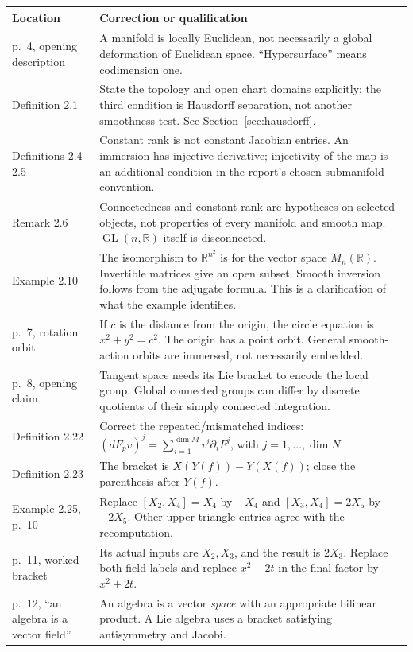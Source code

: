 \documentclass[11pt,a4paper]{article}
\numberwithin{equation}{section}
\theoremstyle{definition}
\theoremstyle{plain}
\theoremstyle{remark}
\newcommand{\R}{\mathbb R}
\newcommand{\GL}{\operatorname{GL}}
\begin{document}
\small
\begin{longtable}{@{}>{\raggedright\arraybackslash}p{.21\linewidth}>{\raggedright\arraybackslash}p{.73\linewidth}@{}}
\toprule Location & Correction or qualification \\
\midrule\endhead
p.~4, opening description & A manifold is locally Euclidean, not necessarily a global deformation of Euclidean space. ``Hypersurface'' means codimension one.\\
Definition 2.1 & State the topology and open chart domains explicitly; the third condition is Hausdorff separation, not another smoothness test. See Section~\ref{sec:hausdorff}.\\
Definitions 2.4--2.5 & Constant rank is not constant Jacobian entries. An immersion has injective derivative; injectivity of the map is an additional condition in the report's chosen submanifold convention.\\
Remark 2.6 & Connectedness and constant rank are hypotheses on selected objects, not properties of every manifold and smooth map. $\GL(n,\R)$ itself is disconnected.\\
Example 2.10 & The isomorphism to $\R^{n^2}$ is for the vector space $M_n(\R)$. Invertible matrices give an open subset. Smooth inversion follows from the adjugate formula. This is a clarification of what the example identifies.\\
p.~7, rotation orbit & If $c$ is the distance from the origin, the circle equation is $x^2+y^2=c^2$. The origin has a point orbit. General smooth-action orbits are immersed, not necessarily embedded.\\
p.~8, opening claim & Tangent space needs its Lie bracket to encode the local group. Global connected groups can differ by discrete quotients of their simply connected integration.\\
Definition 2.22 & Correct the repeated/mismatched indices: $(dF_pv)^j=\sum_{i=1}^{\dim M}v^i\partial_iF^j$, with $j=1,\ldots,\dim N$.\\
Definition 2.23 & The bracket is $X(Y(f))-Y(X(f))$; close the parenthesis after $Y(f)$.\\
Example 2.25, p.~10 & Replace $[X_2,X_4]=X_4$ by $-X_4$ and $[X_3,X_4]=2X_5$ by $-2X_5$. Other upper-triangle entries agree with the recomputation.\\
p.~11, worked bracket & Its actual inputs are $X_2,X_3$, and the result is $2X_3$. Replace both field labels and replace $x^2-2t$ in the final factor by $x^2+2t$.\\
p.~12, ``an algebra is a vector field'' & An algebra is a vector \emph{space} with an appropriate bilinear product. A Lie algebra uses a bracket satisfying antisymmetry and Jacobi.\\

\end{longtable}
\end{document}
